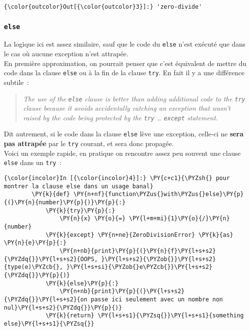 \begin{Verbatim}[commandchars=\\\{\}]
{\color{outcolor}Out[{\color{outcolor}3}]:} 'zero-divide'
\end{Verbatim}
            
    \hypertarget{else}{%
\subsubsection{\texorpdfstring{\texttt{else}}{else}}\label{else}}

    La logique ici est assez similaire, sauf que le code du \texttt{else}
n'est exécuté que dans le cas où aucune exception n'est attrapée.\\

    En première approximation, on pourrait penser que c'est équivalent de
mettre du code dans la clause \texttt{else} ou à la fin de la clause
\texttt{try}. En fait il y a une différence subtile~:\\

\begin{quote}
\emph{The use of the \texttt{else} clause is better than adding
additional code to the \texttt{try} clause because it avoids
accidentally catching an exception that wasn't raised by the code being
protected by the \texttt{try} \ldots{} \texttt{except} statement.}
\end{quote}

Dit autrement, si le code dans la clause \texttt{else} lève une
exception, celle-ci ne \textbf{sera pas attrapée} par le \texttt{try}
courant, et sera donc propagée.\\

    Voici un exemple rapide, en pratique on rencontre assez peu souvent une
clause \texttt{else} dans un \texttt{try}~:

    \begin{Verbatim}[commandchars=\\\{\}]
{\color{incolor}In [{\color{incolor}4}]:} \PY{c+c1}{\PYZsh{} pour montrer la clause else dans un usage banal}
        \PY{k}{def} \PY{n+nf}{function\PYZus{}with\PYZus{}else}\PY{p}{(}\PY{n}{number}\PY{p}{)}\PY{p}{:}
            \PY{k}{try}\PY{p}{:}
                \PY{n}{x} \PY{o}{=} \PY{l+m+mi}{1}\PY{o}{/}\PY{n}{number}
            \PY{k}{except} \PY{n+ne}{ZeroDivisionError} \PY{k}{as} \PY{n}{e}\PY{p}{:}
                \PY{n+nb}{print}\PY{p}{(}\PY{n}{f}\PY{l+s+s2}{\PYZdq{}}\PY{l+s+s2}{OOPS, }\PY{l+s+s2}{\PYZob{}}\PY{l+s+s2}{type(e)\PYZcb{}, }\PY{l+s+si}{\PYZob{}e\PYZcb{}}\PY{l+s+s2}{\PYZdq{}}\PY{p}{)}
            \PY{k}{else}\PY{p}{:}
                \PY{n+nb}{print}\PY{p}{(}\PY{l+s+s2}{\PYZdq{}}\PY{l+s+s2}{on passe ici seulement avec un nombre non nul}\PY{l+s+s2}{\PYZdq{}}\PY{p}{)}
            \PY{k}{return} \PY{l+s+s1}{\PYZsq{}}\PY{l+s+s1}{something else}\PY{l+s+s1}{\PYZsq{}}
\end{Verbatim}


